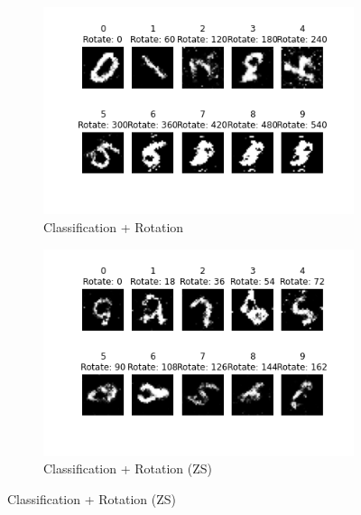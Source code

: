 \documentclass[11pt, letterpaper, oneside]{article}
\begin{document}
\begin{figure}

    \begin{subfigure}{.5\textwidth}
      \centering
      \includegraphics[width=1\linewidth]{Digit_RotateZSL.png}  
      \caption{Classification + Rotation}
      \label{fig:sub-first}
    \end{subfigure}
    \begin{subfigure}{.5\textwidth}
      \centering
      \includegraphics[width=1\linewidth]{DigitZSL_Rotate.png}  
      \caption{Classification + Rotation (ZS)}
      \label{fig:sub-second}
    \end{subfigure}



\end{figure}
\end{document}
